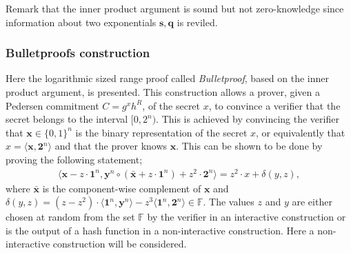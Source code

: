 \begin{comment}
\end{itemize}
\item\text{\textbf{Verify} $(\textit{proof}_{IP} = (\mathbf{g},\mathbf{h},u,P_v,s,q,\mathbf{l},\mathbf{r}))\xrightarrow[]{}\{0,1\}$}\\
For $i\in\{0,log(n)\}$ put $n=n/2$ and $y=\text{Hash}(\bm{l}[i],\bm{r}[i])$, then update the vectors $\bm{g}$ and $\bm{h}$ as well as the  variable $P_v'$ according to, $\bm{g}'= \bm{g}_{[:,n]}^{y^{-1}} \bm{g}_{[n,:]}^{'y}$, $\bm{h}= \bm{h}_l{[:,n]}^{x}\bm{h}_{[n,:]}^{y^{-1}}$ and $ P_v' = L^{y^2}PR^{y^{-2}}  $. After iterating over all $i$ the dimension of the vectors $\bm{g},\bm{h}$ is one and the bold font can be dropped. Compute  $c=\langle s, q\rangle$ and  accept if $P_v' =g^sh^ru^c$.
\end{itemize}
\label{alg:inner_product}
\end{algorithm}
\end{comment}


 
Remark that the inner product argument is sound but not zero-knowledge since information about two exponentials $\mathbf{s},\mathbf{q}$ is reviled.

\subsubsection*{Bulletproofs construction}
Here the logarithmic sized range proof called \textit{Bulletproof}, based  on the inner product argument, is presented. This construction allows a prover, given a Pedersen commitment $C=g^x h^R$, of the secret $x$, to convince a verifier that the secret belongs to the interval $[0,2^n)$. This is achieved by convincing the verifier that  $\bm{x}\in\{0,1\}^n$ is the binary representation of the secret $x$, or equivalently that $x= \langle \bm{x},\mathbf{2}^n\rangle $ and that the prover knows $\bm{x}$.
This can be shown to be done by proving the following statement;
\begin{align}
    \big\langle \bm{x} -z\cdot \bm{1}^n, \bm{y}^n\circ (\bm{\bar{x}} + z \cdot\bm{1}^n) + z^2\cdot\bm{2}^n \big\rangle = z^2\cdot x+ \delta(y,z),
    \label{eq:range_non_zero}
\end{align}
where $\bar{\bm{x}}$ is the component-wise complement of $\bm{x}$ and $\delta(y,z) = (z-z^2)\cdot\langle\bm{1}^n,\bm{y}^n\rangle-z^3\langle \bm{1}^n,\bm{2}^n\rangle\in\mathds{F}$.
The values $z$ and $y$ are either chosen at random from the set $\mathds{F}$ by the verifier in an interactive construction or is the output of a hash function in a non-interactive construction. Here a non-interactive construction will be considered. 

